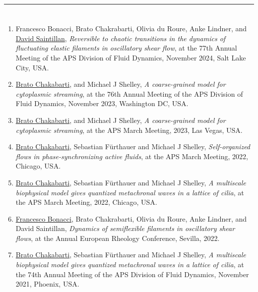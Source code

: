 \documentclass[10pt]{res} %
\begin{document}
\begin{resume}
\vspace*{-2mm}
\noindent\rule{\textwidth}{0.6pt}
\vspace*{-10mm}
\section{} 
\vspace*{8mm}
\begin{enumerate}
\item  {Francesco Bonacci}, Brato Chakrabarti, Olivia du Roure, Anke Lindner, and \underline{David Saintillan}, \textit{Reversible to chaotic transitions in the dynamics of fluctuating elastic filaments in oscillatory shear flow}, at the 77th Annual Meeting of the APS Division of Fluid Dynamics, November 2024, Salt Lake City, USA.
	
\item  \underline{Brato Chakabarti}, and Michael J Shelley, \textit{A coarse-grained model for cytoplasmic streaming}, at the 76th Annual Meeting of the APS Division of Fluid Dynamics, November 2023, Washington DC, USA.

\item  \underline{Brato Chakabarti}, and Michael J Shelley, \textit{A coarse-grained model for cytoplasmic streaming}, at the APS March Meeting, 2023, Las Vegas, USA.

\item  \underline{Brato Chakabarti}, Sebastian F\"{u}rthauer and Michael J Shelley, \textit{Self-organized flows in phase-synchronizing active fluids}, at the APS March Meeting, 2022, Chicago, USA.
	
\item  \underline{Brato Chakabarti}, Sebastian F\"{u}rthauer and Michael J Shelley, \textit{A multiscale biophysical model gives quantized metachronal waves in a lattice of cilia}, at the APS March Meeting, 2022, Chicago, USA.
	
\item \underline{Francesco Bonacci}, Brato Chakrabarti, Olivia du Roure, Anke Lindner, and David Saintillan, \textit{Dynamics of semiflexible filaments in oscillatory shear flows}, at the Annual European Rheology Conference, Sevilla, 2022.

\item  \underline{Brato Chakabarti}, Sebastian F\"{u}rthauer and Michael J Shelley, \textit{A multiscale biophysical model gives quantized metachronal waves in a lattice of cilia}, at the 74th Annual Meeting of the APS Division of Fluid Dynamics, November 2021, Phoenix, USA.


\end{enumerate}
\end{resume}
\end{document}

